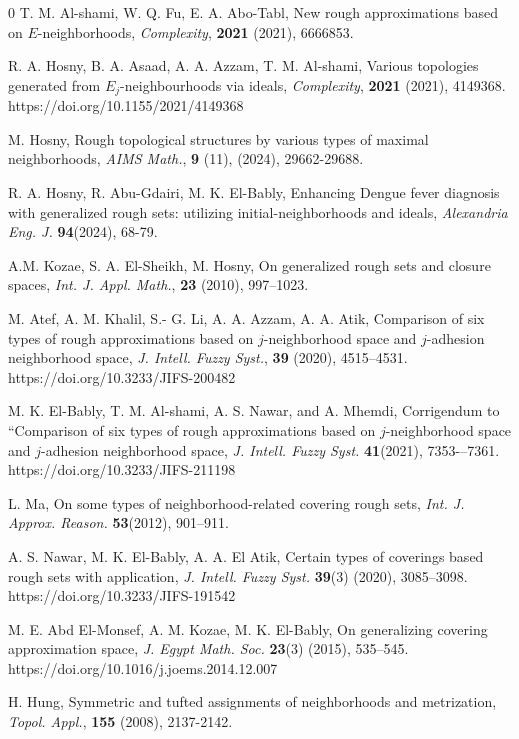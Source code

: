 \documentclass{article}
\theoremstyle{theorem}
\theoremstyle{definition}
\theoremstyle{remark}
\begin{document}
\begin{thebibliography}{0}
 T. M. Al-shami, W. Q. Fu, E. A. Abo-Tabl, New rough approximations based on $E$-neighborhoods, \emph{Complexity}, \textbf{2021} (2021), 6666853.

 R. A. Hosny, B. A. Asaad, A. A. Azzam, T. M. Al-shami, Various topologies generated from $E_{j}$-neighbourhoods via ideals, \emph{Complexity}, \textbf{2021} (2021), 4149368. https://doi.org/10.1155/2021/4149368

 M. Hosny, Rough topological structures by various types of maximal neighborhoods, \emph{ AIMS Math.}, \textbf{9} (11), (2024), 29662-29688.

 R. A. Hosny, R. Abu-Gdairi, M. K. El-Bably, Enhancing Dengue fever diagnosis with generalized rough sets: utilizing initial-neighborhoods and ideals, \emph{Alexandria Eng. J.} \textbf{94}(2024), 68-79.

 A.M. Kozae, S. A. El-Sheikh, M. Hosny, On generalized rough sets and closure spaces, \emph{Int. J. Appl. Math.}, \textbf{23} (2010), 997–1023.

 M. Atef, A. M. Khalil, S.- G. Li, A. A. Azzam, A. A. Atik, Comparison of six types of rough approximations based on $j$-neighborhood space and $j$-adhesion neighborhood space,\emph{ J. Intell. Fuzzy Syst.}, \textbf{39} (2020), 4515--4531. https://doi.org/10.3233/JIFS-200482

 M. K. El-Bably, T. M. Al-shami, A. S. Nawar, and A. Mhemdi, Corrigendum to “Comparison of six types of rough approximations based on $j$-neighborhood space and $j$-adhesion neighborhood space, \emph{J. Intell. Fuzzy Syst.} \textbf{41}(2021), 7353-–7361. https://doi.org/10.3233/JIFS-211198

 L. Ma, On some types of neighborhood-related covering rough sets, \emph{Int. J. Approx. Reason.} \textbf{53}(2012), 901–911.

 A. S. Nawar, M. K. El-Bably, A. A. El Atik, Certain types of coverings based rough sets with application, \emph{J. Intell. Fuzzy Syst.} \textbf{39}(3) (2020), 3085--3098. https://doi.org/10.3233/JIFS-191542

 M. E. Abd El-Monsef, A. M. Kozae, M. K. El-Bably, On generalizing covering approximation space, \emph{J. Egypt Math. Soc.} \textbf{23}(3) (2015), 535--545. https://doi.org/10.1016/j.joems.2014.12.007

 H. Hung, Symmetric and tufted assignments of neighborhoods and metrization, \emph{Topol. Appl.}, \textbf{155} (2008), 2137-2142.


\end{thebibliography}
\end{document}
